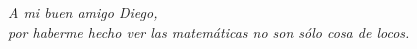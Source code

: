 
\thispagestyle{empty}
{}

\hfill
\vfill

\begin{flushright}
\itshape
A mi buen amigo Diego, \\
por haberme hecho ver las matemáticas 
no son sólo cosa de locos.
\end{flushright}

\vfill

\cleardoublepage
\endinput
